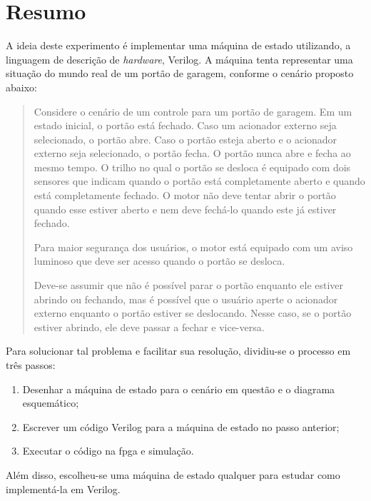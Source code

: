 \chapter{Resumo}
	A ideia deste experimento é implementar uma máquina de estado utilizando, a linguagem de descrição
	de \textit{hardware}, Verilog.
	A máquina tenta representar uma situação do mundo real de um portão de garagem,
	conforme o cenário proposto abaixo:

	\begin{quotation}
		Considere o cenário de um controle para um portão de garagem. Em um estado inicial, o portão
		está fechado. Caso um acionador externo seja selecionado, o portão abre. Caso o portão esteja
		aberto e o acionador externo seja selecionado, o portão fecha. O portão nunca abre e fecha ao
		mesmo tempo. O trilho no qual o portão se desloca é equipado com dois sensores que indicam
		quando o portão está completamente aberto e quando está completamente fechado. O motor
		não deve tentar abrir o portão quando esse estiver aberto e nem deve fechá-lo quando este já
		estiver fechado.

		Para maior segurança dos usuários, o motor está equipado com um aviso luminoso que deve ser
		acesso quando o portão se desloca.

		Deve-se assumir que não é possível parar o portão enquanto ele estiver abrindo ou fechando,
		mas é possível que o usuário aperte o acionador externo enquanto o portão estiver se
		deslocando. Nesse caso, se o portão estiver abrindo, ele deve passar a fechar e vice-versa.
	\end{quotation}

	Para solucionar tal problema e facilitar sua resolução, dividiu-se o processo em três passos:
	\begin{enumerate}
	   \item Desenhar a máquina de estado para o cenário em questão e o diagrama esquemático;
	   \item Escrever um código Verilog para a máquina de estado no passo anterior;
	   \item Executar o código na \ac{fpga} e simulação.
	 \end{enumerate}

	 Além disso, escolheu-se uma máquina de estado qualquer para estudar como
	 implementá-la em Verilog.
